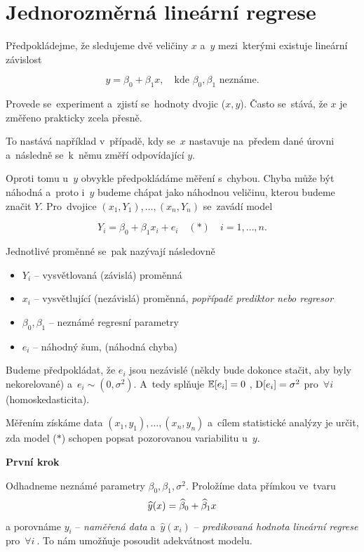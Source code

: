 \chapter{Jednorozměrná lineární regrese}
Předpokládejme, že sledujeme dvě veličiny $ x $ a~$ y $ mezi~kterými existuje lineární závislost

$$
	y = \beta_{0} + \beta_{1} x,\quad \text{kde } \beta_{0}, \beta_{1} \text{ neznáme.}
$$

Provede se~experiment a~zjistí se~hodnoty dvojic ($ x , y $). Často se~stává, že $ x $ je změřeno prakticky zcela přesně.

\begin{remark}
 To nastává například v~případě, kdy se~$ x $ nastavuje na~předem dané úrovni a~následně se~k~němu změří odpovídající $ y $.
\end{remark}
 
Oproti tomu u~$ y $ obvykle předpokládáme měření s~chybou. Chyba může být náhodná a~proto i~$ y $ budeme chápat jako náhodnou veličinu, kterou budeme značit $ Y $. Pro~dvojice $ (x_{1}, Y_{1}), \dots ,( x_{n}, Y_{n} )$ se~zavádí model

$$
	Y_{i} = \beta_{0} + \beta_{1} x_{i} + e_{i} \quad (*) \quad i= 1, \dots ,n.
$$

Jednotlivé proměnné se~pak nazývají následovně

\begin{itemize}
  \item $ Y_{i} $ -- vysvětlovaná (závislá) proměnná
  \item $ x_{i} $ -- vysvětlující (nezávislá) proměnná, \textit{popřípadě prediktor nebo regresor}
  \item $ \beta_{0},\beta_{1} $ -- neznámé regresní parametry
  \item $ e_{i} $ -- náhodný šum, (náhodná chyba)
\end{itemize}

Budeme předpokládat, že $ e_{i} $ jsou nezávislé (někdy bude dokonce stačit, aby byly nekorelované) a~$ e_{i} \sim (0,\sigma ^{2}) $. A~tedy splňuje $ \mathbb{E} [ e_{i} ]  = 0 $ , $ \mathrm{D} [ e_{i} ] = \sigma ^{2} $ pro~$ \forall i~$ (homoskedasticita).

Měřením získáme data $ (x_{1}, y_{1}), \dots ,( x_{n}, y_{n} )$ a~cílem statistické analýzy je určit, zda model ($*$) schopen popsat pozorovanou variabilitu u~$ y $. 

\textbf{První krok }

Odhadneme neznámé parametry $ \beta_{0}, \beta_{1}, \sigma^{2} $. Proložíme data přímkou ve~tvaru
$$
	\widehat{y}(x) = \widehat{\beta}_{0} + \widehat{\beta}_{1} x 
$$
a porovnáme $ y_{i} $ -- \textit{naměřená data} a~$ \widehat{y}(x_{i}) $ -- \textit{predikovaná hodnota lineární regrese} pro~$ \forall i~$. To nám umožňuje posoudit adekvátnost modelu.

